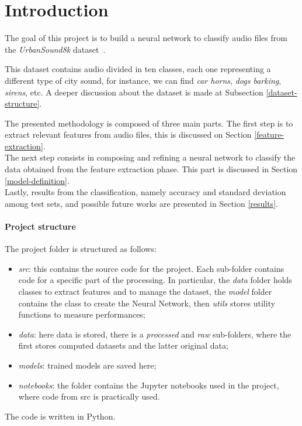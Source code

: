\section{Introduction}

The goal of this project is to build a neural network to classify audio 
files from the \emph{UrbanSound8k} dataset~\cite{dataset}.

This dataset contains audio divided in ten classes, each one representing 
a different type of city sound, for instance, we can find \emph{car horns}, 
\emph{dogs barking}, \emph{sirens}, etc. A deeper discussion about 
the dataset is made at Subsection \vref*{dataset-structure}.

The presented methodology is composed of three main parts.
The first step is to extract relevant features from audio files, 
this is discussed on Section \vref*{feature-extraction}.\\
The next step consists in composing and refining a neural network 
to classify the data obtained from the feature extraction phase. This part is
discussed in Section \vref*{model-definition}.\\
Lastly, results from the classification, namely accuracy 
and standard deviation among test sets, and possible future works 
are presented in Section \vref*{results}.

\paragraph{Project structure}

The project folder is structured as follows:
\begin{itemize}
    \item \emph{src}: this contains the source code for the
    project. Each sub-folder contains code for a specific part of the 
    processing. In particular, the \emph{data} folder holds classes to 
    extract features and to manage the dataset, the \emph{model} folder
    contains the class to create the Neural Network, then \emph{utils} 
    stores utility functions to measure performances;
    \item \emph{data}: here data is stored, there is a \emph{processed}
    and \emph{raw} sub-folders, where the first stores computed datasets 
    and the latter original data;
    \item \emph{models}: trained models are saved here;
    \item \emph{notebooks}: the folder contains the Jupyter notebooks 
    used in the project, where code from src is practically used.
\end{itemize}
The code is written in Python.
\newpage